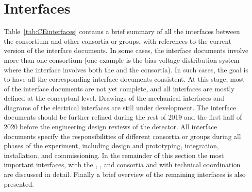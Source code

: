 \section{Interfaces}
\label{sec:fdsp-tpcelec-interfaces}

Table~\ref{tab:CEinterfaces} contains a brief summary of all the interfaces
between the  consortium and other consortia or groups,
with references to the current version of the interface documents. 
In some cases, the interface documents involve more than one 
consortium (one example is the bias voltage distribution system where
the interface involves both the  and the  consortia).
In such cases, the goal is to have all the corresponding interface documents 
consistent. At this stage, most of the interface documents are
not yet complete, and all interfaces are mostly defined at the conceptual
level. Drawings of the mechanical interfaces and diagrams
of the electrical interfaces are still under development. The interface 
documents should be further refined during the rest of 2019 and the 
first half of 2020 before the engineering design
reviews of the detector. All interface documents specify the responsibilities
of different consortia or groups during all phases of the experiment,
including design and prototyping, integration, installation,
and commissioning. In the remainder of this section the most
important interfaces, with the , , and 
consortia and with technical coordination are discussed in detail.
Finally a brief overview of the remaining interfaces is also presented.


